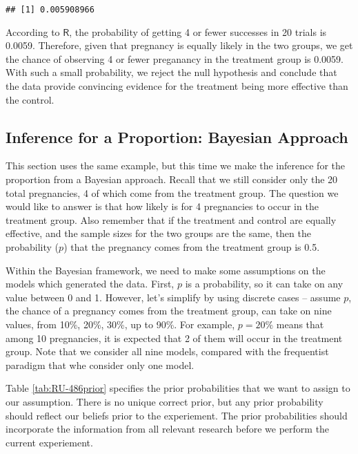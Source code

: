 \documentclass[]{book}
\theoremstyle{definition}
\theoremstyle{definition}
\theoremstyle{remark}
\begin{document}
\begin{verbatim}
## [1] 0.005908966
\end{verbatim}

According to \(\mathsf{R}\), the probability of getting 4 or fewer
successes in 20 trials is 0.0059. Therefore, given that pregnancy is
equally likely in the two groups, we get the chance of observing 4 or
fewer preganancy in the treatment group is 0.0059. With such a small
probability, we reject the null hypothesis and conclude that the data
provide convincing evidence for the treatment being more effective than
the control.

\subsection{Inference for a Proportion: Bayesian
Approach}\label{inference-for-a-proportion-bayesian-approach}

This section uses the same example, but this time we make the inference
for the proportion from a Bayesian approach. Recall that we still
consider only the 20 total pregnancies, 4 of which come from the
treatment group. The question we would like to answer is that how likely
is for 4 pregnancies to occur in the treatment group. Also remember that
if the treatment and control are equally effective, and the sample sizes
for the two groups are the same, then the probability (\(p\)) that the
pregnancy comes from the treatment group is 0.5.

Within the Bayesian framework, we need to make some assumptions on the
models which generated the data. First, \(p\) is a probability, so it
can take on any value between 0 and 1. However, let's simplify by using
discrete cases -- assume \(p\), the chance of a pregnancy comes from the
treatment group, can take on nine values, from 10\%, 20\%, 30\%, up to
90\%. For example, \(p = 20\%\) means that among 10 pregnancies, it is
expected that 2 of them will occur in the treatment group. Note that we
consider all nine models, compared with the frequentist paradigm that
whe consider only one model.

Table \ref{tab:RU-486prior} specifies the prior probabilities that we
want to assign to our assumption. There is no unique correct prior, but
any prior probability should reflect our beliefs prior to the
experiement. The prior probabilities should incorporate the information
from all relevant research before we perform the current experiement.
\end{document}
